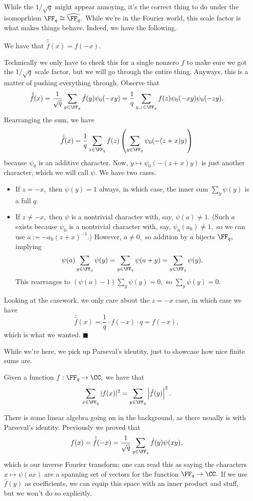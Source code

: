 While the $1/\sqrt q$ might appear annoying, it's the correct thing to do under the isomoprhism $\FF_q\cong\widehat{\FF_q}.$ While we're in the Fourier world, this scale factor is what makes things behave. Indeed, we have the following.
\begin{proposition}
    We have that $\hat{\hat f}(x)=f(-x).$
\end{proposition}
Technically we only have to check this for a single nonzero $f$ to make sure we got the $1/\sqrt q$ scale factor, but we will go through the entire thing. Anyways, this is a matter of pushing everything through. Observe that
\[\hat{\hat f}(x)=\frac1{\sqrt q}\sum_{y\in\FF_q}\hat f(y)\psi_0(-xy)=\frac1q\sum_{y,z\in\FF_q}f(z)\psi_0(-xy)\psi_0(-zy).\]
Rearranging the sum, we have
\[\hat{\hat f}(x)=\frac1q\sum_{z\in\FF_q}f(z)\left(\sum_{y\in\FF_q}\psi_0(-(z+x)y)\right)\]
because $\psi_0$ is an additive character. Now, $y\mapsto\psi_0(-(z+x)y)$ is just another character, which we will call $\psi.$ We have two cases.
\begin{itemize}
    \item If $z=-x,$ then $\psi(y)=1$ always, in which case, the inner sum $\sum_y\psi(y)$ is a full $q.$
    \item If $z\ne-x,$ then $\psi$ is a nontrivial character with, say, $\psi(a)\ne1.$ (Such $a$ exists because $\psi_0$ is a nontrivial character with, say, $\psi_0(a_0)\ne1,$ so we can use $a:=-a_0(z+x)^{-1}.$) However, $a\ne0,$ so addition by $a$ bijects $\FF_q,$ implying
    \[\psi(a)\sum_{y\in\FF_q}\psi(y)=\sum_{y\in\FF_q}\psi(a+y)=\sum_{y\in\FF_q}\psi(y).\]
    This rearranges to $(\psi(a)-1)\sum_y\psi(y)=0,$ so $\sum_y\psi(y)=0.$
\end{itemize}
Looking at the casework, we only care about the $z=-x$ case, in which case we have
\[\hat{\hat f}(x)=\frac1q\cdot f(-x)\cdot q=f(-x),\]
which is what we wanted. $\blacksquare$

While we're here, we pick up Parseval's identity, just to showcase how nice finite sums are.
\begin{proposition}
    Given a function $f:\FF_q\to\CC,$ we have that
    \[\sum_{x\in\FF_q}|f(x)|^2=\sum_{y\in\FF_q}\left|\hat f(y)\right|^2.\]
\end{proposition}
There is some linear algebra going on in the background, as there usually is with Parseval's identity. Previously we proved that
\[f(x)=\hat{\hat f}(-x)=\frac1{\sqrt q}\sum_{y\in\FF_q}\hat f(y)\psi(xy),\]
which is our inverse Fourier transform; one can read this as saying the characters $x\mapsto\psi(ax)$ are a spanning set of vectors for the function $\FF_q\to\CC.$ If we use $\hat f(y)$ as coefficients, we can equip this space with an inner product and stuff, but we won't do so explicitly.

